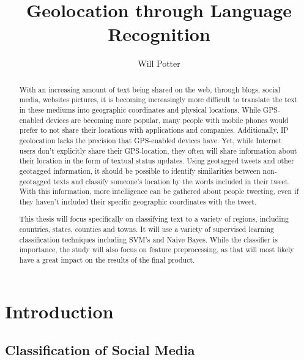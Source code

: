 \documentclass[midd]{thesis}
\title {Geolocation through Language Recognition}
\author {Will Potter}
\begin{document}
\maketitle

\begin{abstract}
With an increasing amount of text being shared on the web, through blogs, social media, websites pictures, it is becoming increasingly more difficult to translate the text in these mediums into geographic coordinates and physical locations. While GPS-enabled devices are becoming more popular, many people with mobile phones would prefer to not share their locations with applications and companies. Additionally, IP geolocation lacks the precision that GPS-enabled devices have. Yet, while Internet users don't explicitly share their GPS-location, they often will share information about their location in the form of textual status updates. Using geotagged tweets and other geotagged information, it should be possible to identify similarities between non-geotagged texts and classify someone's location by the words included in their tweet. With this information, more intelligence can be gathered about people tweeting, even if they haven't included their specific geographic coordinates with the tweet.

This thesis will focus specifically on classifying text to a variety of regions, including countries, states, counties and towns. It will use a variety of supervised learning classification techniques including SVM's and Naive Bayes. While the classifier is importance, the study will also focus on feature preprocessing, as that will most likely have a great impact on the results of the final product.
\end{abstract}

\begin{acknowledgements}
% 
\end{acknowledgements}

\contentspage
\tablelistpage
\figurelistpage

\normalspacing \setcounter{page}{1} 

\chapter{Introduction}

\section{Classification of Social Media}
\end{document}
